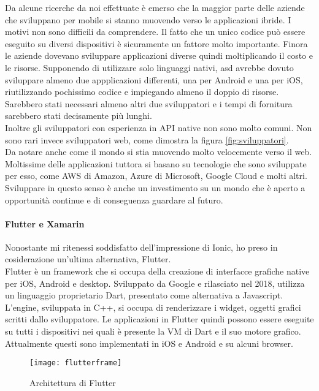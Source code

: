 Da alcune ricerche da noi effettuate è emerso che la maggior parte delle aziende che sviluppano per mobile si stanno
muovendo verso le applicazioni ibride. I motivi non sono difficili da comprendere. Il fatto che un unico codice può
essere eseguito su diversi dispositivi è sicuramente un fattore molto importante. Finora le aziende dovevano sviluppare
applicazioni diverse quindi moltiplicando il costo e le risorse. Supponendo di utilizzare solo linguaggi nativi,
\acrlong{asd} avrebbe dovuto sviluppare almeno due appplicazioni differenti, una per Android e una per iOS,
riutilizzando pochissimo codice e impiegando almeno il doppio di risorse. Sarebbero stati necessari almeno altri due
sviluppatori e i tempi di fornitura sarebbero stati decisamente più lunghi. \\
Inoltre gli sviluppatori con esperienza in API native non sono molto comuni. Non sono rari invece sviluppatori web, come
dimostra la figura \autoref{fig:sviluppatori}. \\
Da notare anche come il mondo si stia muovendo molto velocemente verso il web. Moltissime delle applicazioni tuttora si
basano su tecnologie che sono sviluppate per esso, come AWS di Amazon, Azure di Microsoft, Google Cloud e molti altri.
Sviluppare in questo senso è anche un investimento su un mondo che è aperto a opportunità continue e di conseguenza
guardare al futuro.

\paragraph{Flutter e Xamarin}
Nonostante mi ritenessi soddisfatto dell'impressione di Ionic, ho preso in cosiderazione un'ultima alternativa, Flutter. \\
Flutter è un framework che si occupa della creazione di interfacce grafiche native per iOS, Android e desktop. Sviluppato da Google e
rilasciato nel 2018, utilizza un linguaggio proprietario Dart, presentato come alternativa a Javascript. L'engine, sviluppata in
\gls{C++}, si occupa di renderizzare i widget, oggetti grafici scritti dallo sviluppatore. Le applicazioni in Flutter quindi possono essere
eseguite su tutti i dispositivi nei quali è presente la VM di Dart e il suo motore grafico. Attualmente questi sono implementati in iOS e
Android e su alcuni browser. \\

\begin{figure}[h]
  \texttt{[image: flutterframe]} 
  \caption{Architettura di Flutter}
  \label{fig:flutter}
\end{figure}

